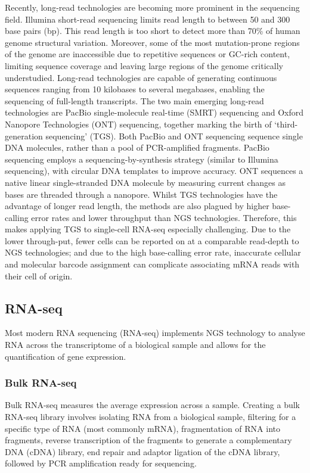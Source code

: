 Recently, long-read technologies are becoming more prominent in the sequencing field.
Illumina short-read sequencing limits read length to between 50 and 300 base pairs (bp)\@.
This read length is too short to detect more than 70\% of human genome structural variation.
Moreover, some of the most mutation-prone regions of the genome are inaccessible due to repetitive sequences or GC-rich content, limiting sequence coverage and leaving large regions of the genome critically understudied\cite{logsdon2020long}.
Long-read technologies are capable of generating continuous sequences ranging from 10 kilobases to several megabases, enabling the sequencing of full-length transcripts.
The two main emerging long-read technologies are PacBio single-molecule real-time (SMRT) sequencing\cite{wenger2019accurate} and Oxford Nanopore Technologies (ONT) sequencing\cite{ip2015minion, jain2016oxford}, together marking the birth of `third-generation sequencing' (TGS).
Both PacBio and ONT sequencing sequence single DNA molecules, rather than a pool of PCR-amplified fragments.
PacBio sequencing employs a sequencing-by-synthesis strategy (similar to Illumina sequencing), with circular DNA templates to improve accuracy.
ONT sequences a native linear single-stranded DNA molecule by measuring current changes as bases are threaded through a nanopore\cite{weirather2017comprehensive}.
Whilst TGS technologies have the advantage of longer read length, the methods are also plagued by higher base-calling error rates and lower throughput than NGS technologies\cite{weirather2017comprehensive, philpott2021nanopore}.
Therefore, this makes applying TGS to single-cell RNA-seq especially challenging.
Due to the lower through-put, fewer cells can be reported on at a comparable read-depth to NGS technologies;
and due to the high base-calling error rate, inaccurate cellular and molecular barcode assignment can complicate associating mRNA reads with their cell of origin.

\subsection{RNA-seq}\label{subsec:rna-seq-intro}
Most modern RNA sequencing (RNA-seq) implements NGS technology to analyse RNA across the transcriptome of a biological sample and allows for the quantification of gene expression.

\subsubsection{Bulk RNA-seq}
Bulk RNA-seq measures the average expression across a sample.
Creating a bulk RNA-seq library involves isolating RNA from a biological sample, filtering for a specific type of RNA (most commonly mRNA), fragmentation of RNA into fragments, reverse transcription of the fragments to generate a complementary DNA (cDNA) library, end repair and adaptor ligation of the cDNA library, followed by PCR amplification ready for sequencing.


